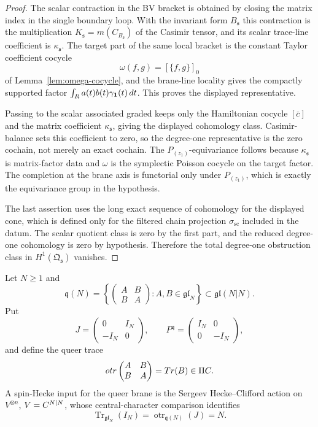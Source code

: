 \begin{proof}
  The scalar contraction in the BV bracket is obtained by closing the
  matrix index in the single boundary loop.  With the invariant form
  \(B_{\mathfrak s}\) this contraction is the multiplication
  \(K_{\mathfrak s}=m(C_{B_{\mathfrak s}})\) of the Casimir tensor, and
  its scalar trace-line coefficient is \(\kappa_{\mathfrak s}\).  The target
  part of the same local bracket is the constant Taylor coefficient
  cocycle
  \[
    \omega(f,g)=[\{f,g\}]_0
  \]
  of Lemma~\ref{lem:omega-cocycle}, and the brane-line locality gives
  the compactly supported factor
  \(\int_{R} a(t)b(t)\gamma_{\mathbf 1}(t)\,dt\).  This proves the
  displayed representative.

  Passing to the scalar associated graded keeps only the Hamiltonian
  cocycle \([\bar c]\) and the matrix coefficient
  \(\kappa_{\mathfrak s}\), giving the displayed cohomology class.
  Casimir-balance sets this coefficient to
  zero, so the degree-one representative is the zero cochain, not
  merely an exact cochain.  The \(P_{(z_1)}\)-equivariance follows because
  \(\kappa_{\mathfrak s}\) is matrix-factor data and \(\omega\) is the
  symplectic Poisson cocycle on the target
  factor.  The completion at the brane axis is functorial only under
  \(P_{(z_1)}\), which is exactly the equivariance group in the
  hypothesis.

  The last assertion uses the long exact sequence of cohomology for the
  displayed cone, which is defined only for the filtered chain projection
  \(\widehat\sigma_{\mathrm{sc}}\) included in the datum.  The scalar
  quotient class is zero by the first part,
  and the reduced degree-one cohomology is zero by hypothesis.  Therefore
  the total degree-one obstruction class in
  \(H^1(\mathfrak Q_{\mathfrak s})\) vanishes.
\end{proof}

\begin{defn}\label{defn:spin-hecke-queer-input}
  Let \(N\ge1\) and
  \[
    \mathfrak q(N)=
    \left\{
      \begin{pmatrix} A&B\\ B&A\end{pmatrix}:
      A,B\in\mathfrak{gl}_N
    \right\}\subset\mathfrak{gl}(N|N).
  \]
  Put
  \[
    J=\begin{pmatrix}0&I_N\\ -I_N&0\end{pmatrix},
    \qquad
    P^{\mathfrak q}=\begin{pmatrix}I_N&0\\0&-I_N\end{pmatrix},
  \]
  and define the queer trace
  \[
    otr
      \begin{pmatrix}A&B\\ B&A\end{pmatrix}
      =Tr(B)\in\Pi C .
  \]
  A spin-Hecke input for the queer brane is the Sergeev
  Hecke--Clifford action on \(V^{\otimes n}\), \(V=C^{N|N}\), whose
  central-character comparison identifies
  \[
    \operatorname{Tr}_{\mathfrak{gl}_N}(I_N)
      =
    \operatorname{otr}_{\mathfrak q(N)}(J)
      =N .
  \]
\end{defn}

